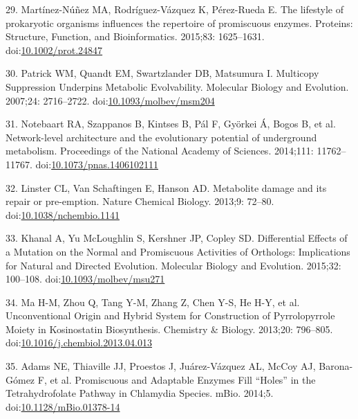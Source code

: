 \documentclass[12pt,twoside]{reedthesis}
\begin{document}
  \hypertarget{ref-martinez-nunezux5flifestyleux5f2015}{}
  29. Martínez-Núñez MA, Rodríguez-Vázquez K, Pérez-Rueda E. The lifestyle
  of prokaryotic organisms influences the repertoire of promiscuous
  enzymes. Proteins: Structure, Function, and Bioinformatics. 2015;83:
  1625--1631.
  doi:\href{https://doi.org/10.1002/prot.24847}{10.1002/prot.24847}
  
  \hypertarget{ref-patrickux5fmulticopyux5f2007}{}
  30. Patrick WM, Quandt EM, Swartzlander DB, Matsumura I. Multicopy
  Suppression Underpins Metabolic Evolvability. Molecular Biology and
  Evolution. 2007;24: 2716--2722.
  doi:\href{https://doi.org/10.1093/molbev/msm204}{10.1093/molbev/msm204}
  
  \hypertarget{ref-notebaartux5fnetwork-levelux5f2014}{}
  31. Notebaart RA, Szappanos B, Kintses B, Pál F, Györkei Á, Bogos B, et
  al. Network-level architecture and the evolutionary potential of
  underground metabolism. Proceedings of the National Academy of Sciences.
  2014;111: 11762--11767.
  doi:\href{https://doi.org/10.1073/pnas.1406102111}{10.1073/pnas.1406102111}
  
  \hypertarget{ref-linsterux5fmetaboliteux5f2013}{}
  32. Linster CL, Van Schaftingen E, Hanson AD. Metabolite damage and its
  repair or pre-emption. Nature Chemical Biology. 2013;9: 72--80.
  doi:\href{https://doi.org/10.1038/nchembio.1141}{10.1038/nchembio.1141}
  
  \hypertarget{ref-khanalux5fdifferentialux5f2015}{}
  33. Khanal A, Yu McLoughlin S, Kershner JP, Copley SD. Differential
  Effects of a Mutation on the Normal and Promiscuous Activities of
  Orthologs: Implications for Natural and Directed Evolution. Molecular
  Biology and Evolution. 2015;32: 100--108.
  doi:\href{https://doi.org/10.1093/molbev/msu271}{10.1093/molbev/msu271}
  
  \hypertarget{ref-maux5funconventionalux5f2013}{}
  34. Ma H-M, Zhou Q, Tang Y-M, Zhang Z, Chen Y-S, He H-Y, et al.
  Unconventional Origin and Hybrid System for Construction of
  Pyrrolopyrrole Moiety in Kosinostatin Biosynthesis. Chemistry \&
  Biology. 2013;20: 796--805.
  doi:\href{https://doi.org/10.1016/j.chembiol.2013.04.013}{10.1016/j.chembiol.2013.04.013}
  
  \hypertarget{ref-adamsux5fpromiscuousux5f2014}{}
  35. Adams NE, Thiaville JJ, Proestos J, Juárez-Vázquez AL, McCoy AJ,
  Barona-Gómez F, et al. Promiscuous and Adaptable Enzymes Fill ``Holes''
  in the Tetrahydrofolate Pathway in Chlamydia Species. mBio. 2014;5.
  doi:\href{https://doi.org/10.1128/mBio.01378-14}{10.1128/mBio.01378-14}
  
\end{document}
